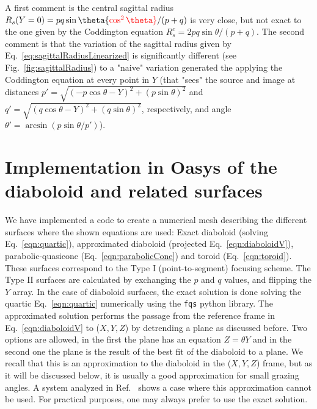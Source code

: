 \documentclass{iucr}              %
\newcommand{\inred}[1]{{\color{red}#1}}
\begin{document}


A first comment is the central sagittal radius $R_s(Y=0)=p q \sin\theta \inred{\cos^2\theta}/ (p+q)$ is very close, but not exact to the one given by the Coddington equation $R_s^c=2 p q \sin\theta / (p+q)$. The second comment is that the variation of the sagittal radius given by Eq.~\ref{eq:sagittalRadiusLinearized} is significantly different (see Fig.~\ref{fig:sagittalRadius}) to a "naive" variation generated the applying the Coddington equation at every point in $Y$ (that "sees" the source and image at distances $p'=\sqrt{(-p \cos\theta - Y)^2 + (p \sin\theta)^2}$ and $q'=\sqrt{(q \cos\theta - Y)^2 + (q \sin\theta)^2}$, respectively, and angle $\theta'=\arcsin(p \sin\theta / p')$).


\section{Implementation in Oasys of the diaboloid and related surfaces}
\label{sec:oasys}

We have implemented a code to create a numerical mesh describing the different surfaces where the shown equations are used: \inred{Exact diaboloid (solving Eq.~\ref{eqn:quartic}), approximated diaboloid (projected Eq.~\ref{eqn:diaboloidV}), parabolic-quasicone (Eq.~\ref{eqn:parabolicCone}) and toroid (Eq.~\ref{eqn:toroid})}. These surfaces correspond to the Type I (point-to-segment) focusing scheme. The Type II surfaces are calculated by exchanging the $p$ and $q$ values, and flipping the $Y$ array. In the case of diaboloid surfaces, the exact solution is done solving the quartic Eq.~\ref{eqn:quartic}  numerically using the {\tt fqs} python library. The approximated solution performs the passage from the reference frame in Eq.~\ref{eqn:diaboloidV} to ($X,Y,Z$) by detrending a plane as discussed before. Two options are allowed, in the first the plane has an equation $Z=\theta Y$ and in the second one the plane is the result of the best fit of the diaboloid to a plane. We recall that this is an approximation to the diaboloid in the ($X,Y,Z$) frame, but as it will be discussed below, it is usually a good approximation for small grazing angles. A system analyzed in Ref.~\cite{Yashchuk2019} shows a case where this approximation cannot be used. \inred{For practical purposes, one may  always prefer to use the exact solution.}
\end{document}
